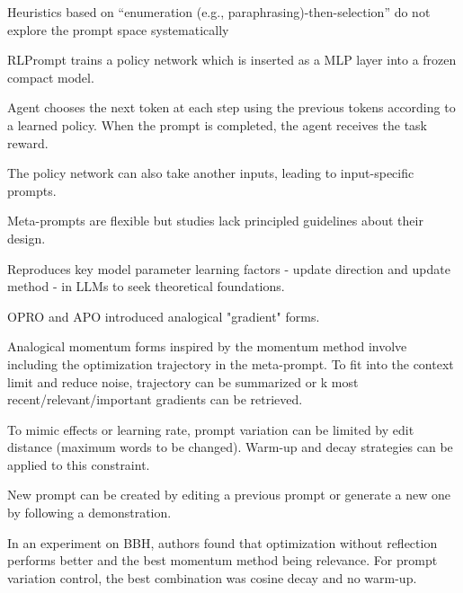 Heuristics based on “enumeration (e.g., paraphrasing)-then-selection” do not explore the prompt space systematically \cite{deng2022rlpromptoptimizingdiscretetext}

RLPrompt trains a policy network which is inserted as a MLP layer into a frozen compact model. \cite{deng2022rlpromptoptimizingdiscretetext}

Agent chooses the next token at each step using the previous tokens according to a learned policy. When the prompt is completed, the agent receives the task reward. \cite{deng2022rlpromptoptimizingdiscretetext}

The policy network can also take another inputs, leading to input-specific prompts. \cite{deng2022rlpromptoptimizingdiscretetext}



Meta-prompts are flexible but studies lack principled guidelines about their design. \cite{tang2024unleashingpotentiallargelanguage}

Reproduces key model parameter learning factors - update direction and update method - in LLMs to seek theoretical foundations. \cite{tang2024unleashingpotentiallargelanguage}

OPRO\cite{yang2024largelanguagemodelsoptimizers} and APO\cite{pryzant2023automaticpromptoptimizationgradient} introduced analogical "gradient" forms. \cite{tang2024unleashingpotentiallargelanguage}

Analogical momentum forms inspired by the momentum method involve including the optimization trajectory in the meta-prompt. To fit into the context limit and reduce noise, trajectory can be summarized or k most recent/relevant/important gradients can be retrieved. \cite{tang2024unleashingpotentiallargelanguage}

To mimic effects or learning rate, prompt variation can be limited by edit distance (maximum words to be changed). Warm-up and decay strategies can be applied to this constraint. \cite{tang2024unleashingpotentiallargelanguage}

New prompt can be created by editing a previous prompt or generate a new one by following a demonstration. \cite{tang2024unleashingpotentiallargelanguage}

In an experiment on BBH, authors found that optimization without reflection performs better and the best momentum method being relevance. For prompt variation control, the best combination was cosine decay and no warm-up.  \cite{tang2024unleashingpotentiallargelanguage}

